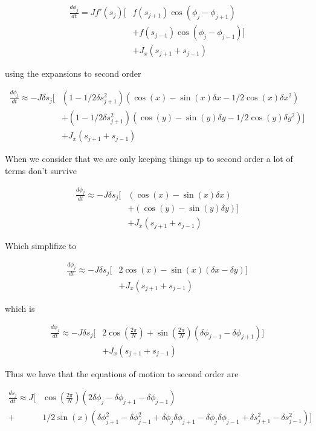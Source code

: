 \documentclass{article}
\begin{document}
\begin{align*}
    \frac{d\phi_j}{dt} = Jf'(s_j)[&f(s_{j+1})\cos(\phi_j - \phi_{j+1}) \\
                                  &+f(s_{j-1})\cos(\phi_j - \phi_{j-1})] \\
                                  &+J_x(s_{j+1} + s_{j-1})
\end{align*}

using the expansions to second order

\begin{align*}
    \frac{d\phi_j}{dt} \approx -J\delta s_j[&(1-1/2\delta s_{j+1}^2)(\cos(x) - \sin(x)\delta x - 1/2 \cos(x)\delta x^2) \\
                                  &+(1-1/2\delta s_{j+1}^2)(\cos(y) - \sin(y)\delta y - 1/2 \cos(y)\delta y^2)] \\
                                  &+J_x(s_{j+1} + s_{j-1})
\end{align*}


When we consider that we are only keeping things up to second order a lot of terms don't survive

\begin{align*}
    \frac{d\phi_j}{dt} \approx -J\delta s_j[&(\cos(x) - \sin(x)\delta x) \\
                                  &+(\cos(y) - \sin(y)\delta y)] \\
                                  &+J_x(s_{j+1} + s_{j-1})
\end{align*}

Which simplifize to 

\begin{align*}
    \frac{d\phi_j}{dt} \approx -J\delta s_j[&2\cos(x) - \sin(x)(\delta x - \delta y)] \\
                                  &+J_x(s_{j+1} + s_{j-1})
\end{align*}

which is

\begin{align*}
    \frac{d\phi_j}{dt} \approx -J\delta s_j[&2\cos(\frac{2\pi}{N}) + \sin(\frac{2\pi}{N})(\delta\phi_{j-1} - \delta\phi_{j+1})] \\
                                  &+J_x(s_{j+1} + s_{j-1})
\end{align*}

\space

Thus we have that the equations of motion to second order are

\begin{align*}
    \frac{ds_j}{dt} \approx J[&\cos(\frac{2\pi}{N})(2\delta\phi_{j} - \delta\phi_{j+1} - \delta\phi_{j-1}) \\
                                +&1/2\sin(x)(\delta\phi_{j+1}^2 - \delta\phi_{j-1}^2 + \delta\phi_{j}\delta\phi_{j+1} - \delta\phi_{j}\delta\phi_{j-1} + \delta s_{j+1}^2 - \delta s_{j-1}^2)]
\end{align*}
\end{document}
